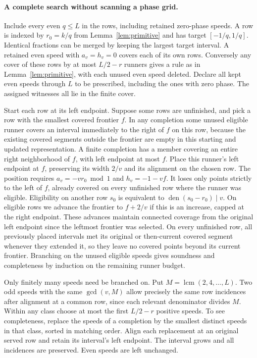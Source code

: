 \documentclass[11pt]{article}
\theoremstyle{definition}
\DeclareMathOperator{\lcm}{lcm}
\begin{document}
\paragraph{A complete search without scanning a phase grid.}
Include every even \(q\le L\) in the rows, including retained zero-phase
speeds. A row is indexed by \(r_0=k/q\) from
Lemma~\ref{lem:primitive} and has target \([-1/q,1/q]\).
Identical fractions can be merged by keeping the largest target
interval. A retained even speed with \(a_v=h_v=0\) covers each of its
own rows. Conversely any cover of these rows by at most \(L/2-r\)
runners gives a rule as in Lemma~\ref{lem:primitive}, with each unused
even speed deleted. Declare all kept even speeds through \(L\) to be
prescribed, including the ones with zero phase. The assigned
witnesses all lie in the finite cover.

Start each row at its left endpoint. Suppose some rows are unfinished,
and pick a row with the smallest covered frontier \(f\). In any
completion some unused eligible runner covers an interval immediately
to the right of \(f\) on this row, because the existing covered
segments outside the frontier are empty in this starting and updated
representation. A finite completion has a member covering an entire
right neighborhood of \(f\), with left endpoint at most \(f\).
Place this runner's left endpoint at \(f\), preserving its width
\(2/v\) and its alignment on the chosen row. The position requires
\(a_v=-vr_0\bmod1\) and \(h_v=-1-vf\). It loses only points strictly
to the left of \(f\), already covered on every unfinished row where
the runner was eligible. Eligibility on another row \(s_0\) is
equivalent to \(\operatorname{den}(s_0-r_0)\mid v\).
On eligible rows we advance the frontier to \(f+2/v\) if this is an
increase, capped at the right endpoint. These advances maintain
connected coverage from the original left endpoint since the leftmost
frontier was selected. On every unfinished row, all previously placed
intervals met its original or then-current covered segment whenever
they extended it, so they leave no covered points beyond its current
frontier. Branching on the unused eligible speeds gives soundness and
completeness by induction on the remaining runner budget.

Only finitely many speeds need be branched on. Put
\(M=\lcm(2,4,\ldots,L)\). Two odd speeds with the same
\(\gcd(v,M)\) allow precisely the same row incidences after alignment
at a common row, since each relevant denominator divides \(M\).
Within any class choose at most the first \(L/2-r\) positive speeds.
To see completeness, replace the speeds of a completion by the
smallest distinct speeds in that class, sorted in matching order.
Align each replacement at an original served row and retain its
interval's left endpoint. The interval grows and all incidences are
preserved. Even speeds are left unchanged.
\end{document}
